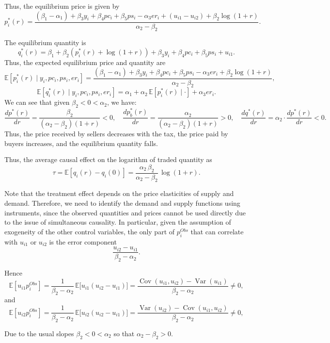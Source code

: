 Thus, the equilibrium price is given by
\[
p_i^*(r) = \frac{(\beta_1 - \alpha_1) + \beta_3 y_i + \beta_4 pc_i + \beta_5 ps_i - \alpha_3 er_i + (u_{i1} - u_{i2}) + \beta_2 \log(1+r)}{\alpha_2 - \beta_2}.
\]

The equilibrium quantity is
\[
q_i^*(r) = \beta_1 + \beta_2\left(p_i^*(r) + \log(1+r)\right) + \beta_3 y_i + \beta_4 pc_i + \beta_5 ps_i + u_{i1}.
\]
Thus, the expected equilibrium price and quantity are
\[
\mathbb{E}[p_i^*(r)\mid y_i, pc_i, ps_i, er_i]
=
\frac{(\beta_1 - \alpha_1) + \beta_3 y_i + \beta_4 pc_i + \beta_5 ps_i - \alpha_3 er_i + \beta_2 \log(1+r)}{\alpha_2 - \beta_2},
\]
\[
\mathbb{E}[q_i^*(r)\mid y_i, pc_i, ps_i, er_i]
=
\alpha_1 + \alpha_2 \,\mathbb{E}[p_i^*(r)\mid \cdot] + \alpha_3 er_i.
\]
We can see that given $\beta_2 < 0 < \alpha_2$, we have:
\[
\frac{d p^*(r)}{dr} = \frac{\beta_2}{(\alpha_2 - \beta_2)(1+r)} < 0, \quad
\frac{d p_b^*(r)}{dr} = \frac{\alpha_2}{(\alpha_2 - \beta_2)(1+r)} > 0, \quad
\frac{d q^*(r)}{dr} = \alpha_2 \cdot \frac{d p^*(r)}{dr} < 0.
\]
Thus, the price received by sellers decreases with the tax, the price paid by buyers increases, and the equilibrium quantity falls.
  
Thus, the average causal effect on the logarithm of traded quantity as
\[
\tau = \mathbb{E}[q_i(r) - q_i(0)]= \frac{\alpha_2 \, \beta_2}{\alpha_2 - \beta_2}\,\log(1+r).
\]

Note that the treatment effect depends on the price elasticities of supply and demand. Therefore, we need to identify the demand and supply functions using instruments, since the observed quantities and prices cannot be used directly due to the issue of simultaneous causality. In particular, given the assumption of exogeneity of the other control variables, the only part of $p_i^{Obs}$ that can correlate with $u_{i1}$ or $u_{i2}$ is the error component
\[
\frac{u_{i2}-u_{i1}}{\beta_2-\alpha_2}.
\]

Hence
\[
\mathbb{E}[u_{i1}p_i^{Obs}]
=\frac{1}{\beta_2-\alpha_2}\,\mathbb{E}\!\big[u_{i1}(u_{i2}-u_{i1})\big]
=\frac{\operatorname{Cov}(u_{i1},u_{i2})-\operatorname{Var}(u_{i1})}{\beta_2-\alpha_2}\neq 0,
\]
and
\[
\mathbb{E}[u_{i2}p_i^{Obs}]
=\frac{1}{\beta_2-\alpha_2}\,\mathbb{E}\!\big[u_{i2}(u_{i2}-u_{i1})\big]
=\frac{\operatorname{Var}(u_{i2})-\operatorname{Cov}(u_{i1},u_{i2})}{\beta_2-\alpha_2}\neq 0,
\]

Due to the usual slopes $\beta_2<0<\alpha_2$ so that $\alpha_2-\beta_2>0$.

